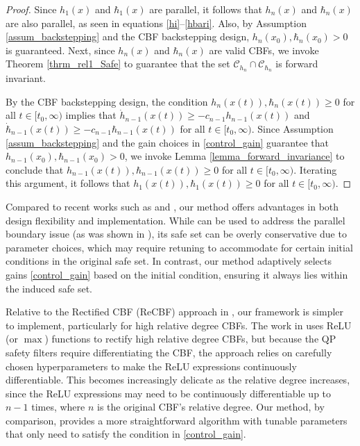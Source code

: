 \documentclass[letterpaper, 10 pt, conference]{ieeeconf}
\newcommand{\TODO}[1]{{\color{black}#1}}
\begin{document}
\begin{proof}
    Since $h_1(x)$ and $\hbar_1(x)$ are parallel, it follows that $h_n(x)$ and $\hbar_n(x)$ are also parallel, as seen in equations \eqref{hi}--\eqref{hbari}. Also, by Assumption \ref{assum_backstepping} and the CBF backstepping design, $h_n(x_0),\hbar_n(x_0) >0$ is guaranteed. Next, since $h_n(x)$ and $\hbar_n(x)$ are valid CBFs, we invoke Theorem \ref{thrm_rel1_Safe} to guarantee that the set $ \mathcal{C}_{h_n} \cap \mathcal{C}_{\hbar_n} $ is forward invariant. 

    By the CBF backstepping design, the condition ${h_n(x(t)), \hbar_n(x(t)) \geq 0}$ for all ${t \in [t_0, \infty)}$ implies that $ \dot{h}_{n-1}(x(t)) \geq -c_{n-1} h_{n-1}(x(t)) $ and $ \dot{\hbar}_{n-1}(x(t)) \geq -c_{n-1} \hbar_{n-1}(x(t)) $ for all $ t \in [t_0, \infty) $. Since Assumption \ref{assum_backstepping} and the gain choices in \eqref{control_gain} guarantee that $ h_{n-1}(x_0), \hbar_{n-1}(x_0) > 0 $, we invoke Lemma \ref{lemma_forward_invariance} to conclude that $ h_{n-1}(x(t)), \hbar_{n-1}(x(t)) \geq 0 $ for all $ t \in [t_0, \infty) $. Iterating this argument, it follows that $ h_1(x(t)), \hbar_1(x(t)) \geq 0 $ for all $ t \in [t_0, \infty) $.
\end{proof}

\TODO{Compared to recent works such as \cite{taylor_safe_2022} and \cite{ong_rectified_2024}, our method offers advantages in both design flexibility and implementation. While \cite{taylor_safe_2022} can be used to address the parallel boundary issue (as was shown in \cite{cohen_backstep_rom_2024}), its safe set can be overly conservative due to parameter choices, which may require retuning to accommodate for certain initial conditions in the original safe set. In contrast, our method adaptively selects gains \eqref{control_gain} based on the initial condition, ensuring it always lies within the induced safe set.

Relative to the Rectified CBF (ReCBF) approach in \cite{ong_rectified_2024}, our framework is simpler to implement, particularly for high relative degree CBFs. The work in \cite{ong_rectified_2024} uses ReLU (or $\max$) functions to rectify high relative degree CBFs, but because the QP safety filters require differentiating the CBF, the approach relies on carefully chosen hyperparameters to make the ReLU expressions continuously differentiable. This becomes increasingly delicate as the relative degree increases, since the ReLU expressions may need to be continuously differentiable up to $n-1$ times, where $n$ is the original CBF's relative degree. Our method, by comparison, provides a more straightforward algorithm with tunable parameters that only need to satisfy the condition in \eqref{control_gain}.
}
\end{document}
